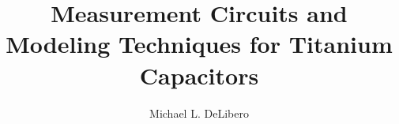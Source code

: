 \documentclass[ms,lof,lot]{metadata/cwru}
\title{Measurement Circuits and Modeling Techniques for Titanium Capacitors}
\author{Michael L. DeLibero}
\begin{document}
\CWRUpreface{}
\CWRUack{}

\CWRUabstract{}

\CWRUpreamble{}











\end{document}
